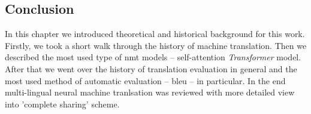 \subsection{Conclusion}

In this chapter we introduced theoretical and historical background for this work.
Firstly, we took a short walk through the history of machine translation.
Then we described the most used type of \acrshort{nmt} models --
self-attention \textit{Transformer} model.
After that we went over the history of translation evaluation in general and the most
used method of automatic evaluation -- \acrshort{bleu} -- in particular.
In the end multi-lingual neural machine tranlsation was reviewed with more detailed view into
'complete sharing' scheme.

